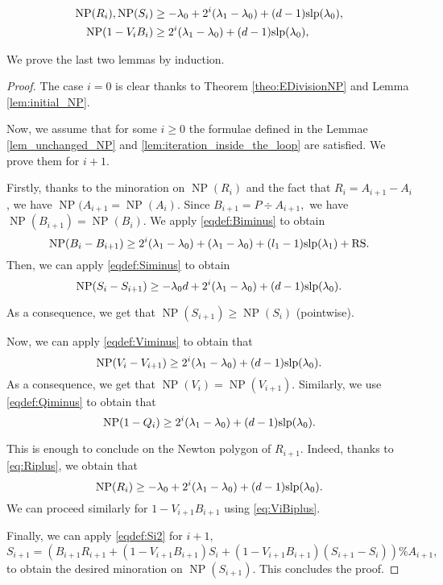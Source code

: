 \documentclass{sig-alternate-2013}
\DeclareMathOperator{\NP}{NP}
\newcommand{\slp}{\text{\rm slp}}
\newcommand{\RS}{\text{\rm RS}}
\begin{document}
\begin{lem} \label{lem:iteration_inside_the_loop}
\begin{align*}
\NP (R_i), \NP(S_i) & \geq -\lambda_0+2^i(\lambda_1-\lambda_0)+(d-1) \slp (\lambda_0), \\
\NP (1-V_i B_i) & \geq 2^i (\lambda_1-\lambda_0)+(d-1) \slp (\lambda_0),\\
\end{align*}
\end{lem}

We prove the last two lemmas by induction.

\begin{proof}
The case $i=0$ is clear thanks to Theorem \ref{theo:EDivisionNP} and Lemma \ref{lem:initial_NP}.

Now, we assume that for some $i \geq 0$ the formulae defined in the Lemmae \ref{lem_unchanged_NP} and \ref{lem:iteration_inside_the_loop} are satisfied. 
We prove them for $i+1$.

Firstly, thanks to the minoration on $\NP (R_i)$ and the fact that $R_i=A_{i+1}-A_i$, we have $\NP (A_{i+1}= \NP (A_i).$
Since $B_{i+1} = P \div A_{i+1},$ we have $\NP (B_{i+1}) = \NP (B_i).$
We apply \eqref{eqdef:Biminus} to obtain 
\[\NP (B_i-B_{i+1})  \geq 2^i (\lambda_1-\lambda_0)+(\lambda_1-\lambda_0)+(l_1-1) \slp (\lambda_1)+\RS. \]
Then, we can apply \eqref{eqdef:Siminus} to obtain 
\[\NP (S_i-S_{i+1})  \geq -\lambda_0 d+2^i (\lambda_1-\lambda_0)+(d-1) \slp (\lambda_0).\]

As a consequence, we get that $\NP (S_{i+1}) \geq \NP (S_i)$ (pointwise).

Now, we can apply \eqref{eqdef:Viminus} to obtain that 
\[\NP (V_i-V_{i+1}) \geq 2^i (\lambda_1-\lambda_0)+(d-1) \slp (\lambda_0).\]
As a consequence, we get that $\NP(V_i)=\NP(V_{i+1}).$
Similarly, we use \eqref{eqdef:Qiminus} to obtain that
\[\NP (1-Q_i)  \geq  2^i (\lambda_1-\lambda_0)+(d-1) \slp (\lambda_0).\]

This is enough to conclude on the Newton polygon of $R_{i+1}.$
Indeed, thanks to \eqref{eq:Riplus}, we obtain that 
\[\NP (R_i) \geq -\lambda_0+2^i(\lambda_1-\lambda_0)+(d-1) \slp (\lambda_0). \]
We can proceed similarly for $1-V_{i+1} B_{i+1}$ using \eqref{eq:ViBiplus}.

Finally, we can apply \eqref{eqdef:Si2} for $i+1,$
\[S_{i+1} = (B_{i+1} R_{i+1} + (1-V_{i+1} B_{i+1}) S_{i}+(1-V_{i+1} B_{i+1})(S_{i+1}-S_{i})) \% A_{i+1},\] to obtain the desired minoration on $\NP (S_{i+1}).$ This concludes the proof.
\end{proof}
\end{document}
